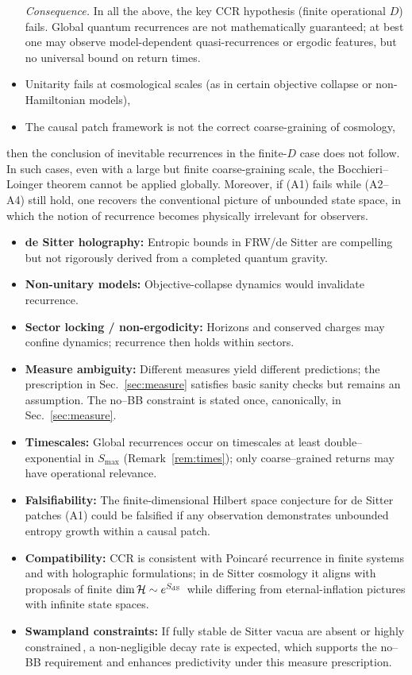 \documentclass[12pt]{article}
\newcommand{\Smax}{S_{\max}}
\theoremstyle{remark}
\begin{document}
\begin{itemize}
\noindent\emph{Consequence.} In all the above, the key CCR hypothesis (finite operational $D$) fails.
Global quantum recurrences are not mathematically guaranteed; at best one may observe model-dependent
quasi-recurrences or ergodic features, but no universal bound on return times.

    
    \item Unitarity fails at cosmological scales (as in certain objective collapse or non-Hamiltonian models),
    \item The causal patch framework is not the correct coarse-graining of cosmology,
\end{itemize}
then the conclusion of inevitable recurrences in the finite-$D$ case does not follow.
In such cases, even with a large but finite coarse-graining scale, the Bocchieri–Loinger theorem cannot be applied globally.
Moreover, if (A1) fails while (A2–A4) still hold, one recovers the conventional picture of unbounded state space, in which the notion of recurrence becomes physically irrelevant for observers.


\begin{itemize}
    \item \textbf{de Sitter holography:} Entropic bounds in FRW/de Sitter are compelling but not rigorously derived from a completed quantum gravity.
    \item \textbf{Non-unitary models:} Objective-collapse dynamics would invalidate recurrence.
    \item \textbf{Sector locking / non-ergodicity:} Horizons and conserved charges may confine dynamics; recurrence then holds within sectors.
    \item \textbf{Measure ambiguity:} Different measures yield different predictions; the prescription in Sec.~\ref{sec:measure} satisfies basic sanity checks but remains an assumption. The no--BB constraint is stated once, canonically, in Sec.~\ref{sec:measure}.
    \item \textbf{Timescales:} Global recurrences occur on timescales at least double--exponential in $\Smax$ (Remark~\ref{rem:times}); only coarse--grained returns may have operational relevance.
    \item \textbf{Falsifiability:} The finite-dimensional Hilbert space conjecture for de Sitter patches (A1) could be falsified if any observation demonstrates unbounded entropy growth within a causal patch.
    \item \textbf{Compatibility:} CCR is consistent with Poincar\'e recurrence in finite systems and with holographic formulations; in de Sitter cosmology it aligns with proposals of finite $\dim\mathcal H\sim e^{S_{\rm dS}}$\,\cite{BanksFischler2001,BanksFischler2003} while differing from eternal-inflation pictures with infinite state spaces.
    \item \textbf{Swampland constraints:} If fully stable de Sitter vacua are absent or highly constrained\,\cite{Obied2018,Ooguri2019}, a non-negligible decay rate is expected, which supports the no--BB requirement and enhances predictivity under this measure prescription.
\end{itemize}
\end{document}
